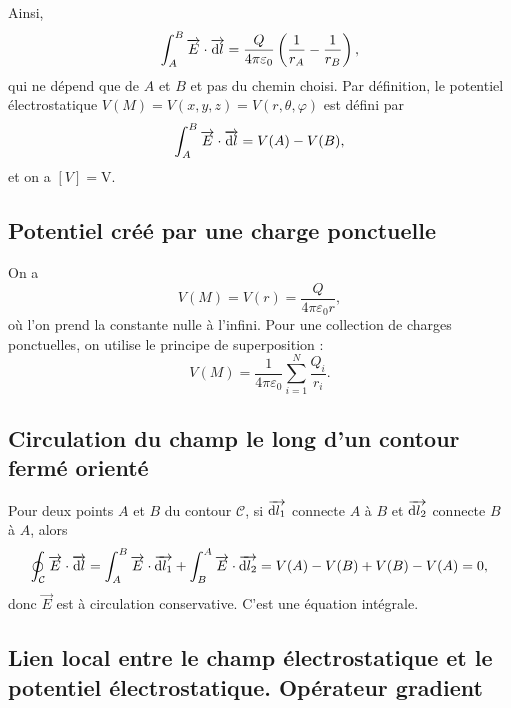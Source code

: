        Ainsi,
        \begin{equation}
            \int_{A}^{B}\protect\overrightarrow{{E}}\cdot\protect\overrightarrow{{\mathrm{d} l}}=\frac{Q}{4\pi\varepsilon_{0}}\left(\frac{1}{r_{A}}-\frac{1}{r_{B}}\right),
        \end{equation}
        qui ne dépend que de $A$ et $B$ et pas du chemin choisi. Par définition, le potentiel électrostatique $V(M)=V(x,y,z)=V(r,\theta,\varphi)$ est défini par 
        \begin{equation}
            \int_{A}^{B}\protect\overrightarrow{{E}}\cdot\protect\overrightarrow{{\mathrm{d} l}}=V(A)-V(B),
        \end{equation}
        et on a $[V]=\si{\volt}$.

    \subsection{Potentiel créé par une charge ponctuelle}

        On a 
        \begin{equation}
            \boxed{
                V(M)=V(r)=\frac{Q}{4\pi\varepsilon_{0}r},
            }
        \end{equation}
        où l'on prend la constante nulle à l'infini. Pour une collection de charges ponctuelles, on utilise le principe de superposition :
        \begin{equation}
            \boxed{
                V(M)=\frac{1}{4\pi\varepsilon_{0}}\sum_{i=1}^{N}\frac{Q_i}{r_i}.
            }
        \end{equation}

    \subsection{Circulation du champ le long d'un contour fermé orienté}

        Pour deux points $A$ et $B$ du contour $\mathcal{C}$, si $\protect\overrightarrow{{\mathrm{d} l_{1}}}$ connecte $A$ à $B$ et $\protect\overrightarrow{{\mathrm{d} l_{2}}}$ connecte $B$ à $A$, alors 
        \begin{equation}
            \oint_{\mathcal{C}}\protect\overrightarrow{{E}}\cdot\protect\overrightarrow{{\mathrm{d} l}}=\int_{A}^{B}\protect\overrightarrow{{E}}\cdot\protect\overrightarrow{{\mathrm{d} l_{1}}}+\int_{B}^{A}\protect\overrightarrow{{E}}\cdot\protect\overrightarrow{{\mathrm{d} l_{2}}}=V(A)-V(B)+V(B)-V(A)=0,
        \end{equation}
        donc $\vec{E}$ est à circulation conservative. C'est une équation intégrale.

    \subsection{Lien local entre le champ électrostatique et le potentiel électrostatique. Opérateur gradient}

